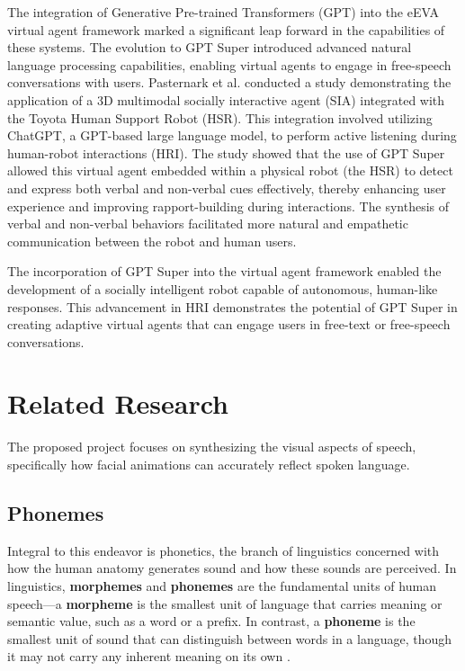 \documentclass[12pt]{article}
\begin{document}
The integration of Generative Pre-trained Transformers (GPT) into the eEVA virtual agent framework marked a significant leap forward in the capabilities of these systems. The evolution to GPT Super introduced advanced natural language processing capabilities, enabling virtual agents to engage in free-speech conversations with users.  Pasternark et al. \cite{Pasternak2024} conducted a study demonstrating the application of a 3D multimodal socially interactive agent (SIA) integrated with the Toyota Human Support Robot (HSR). This integration involved utilizing ChatGPT, a GPT-based large language model, to perform active listening during human-robot interactions (HRI). The study showed that the use of GPT Super allowed this virtual agent embedded within a physical robot (the HSR) to detect and express both verbal and non-verbal cues effectively, thereby enhancing user experience and improving rapport-building during interactions. The synthesis of verbal and non-verbal behaviors facilitated more natural and empathetic communication between the robot and human users.

The incorporation of GPT Super into the virtual agent framework enabled the development of a socially intelligent robot capable of autonomous, human-like responses. This advancement in HRI demonstrates the potential of GPT Super in creating adaptive virtual agents that can engage users in free-text or free-speech conversations.  

\section{Related Research}
\label{sec:relatedResearch}

 The proposed project focuses on synthesizing the visual aspects of speech, specifically how facial animations can accurately reflect spoken language. 
 
 \subsection{Phonemes} 
 \label{sec:phonemes}
 Integral to this endeavor is phonetics, the branch of linguistics concerned with how the human anatomy generates sound and how these sounds are perceived. In linguistics, \textbf{morphemes} and \textbf{phonemes} are the fundamental units of human speech—a \textbf{morpheme} is the smallest unit of language that carries meaning or semantic value, such as a word or a prefix. In contrast, a \textbf{phoneme} is the smallest unit of sound that can distinguish between words in a language, though it may not carry any inherent meaning on its own \cite{Payack2008}.
\end{document}
